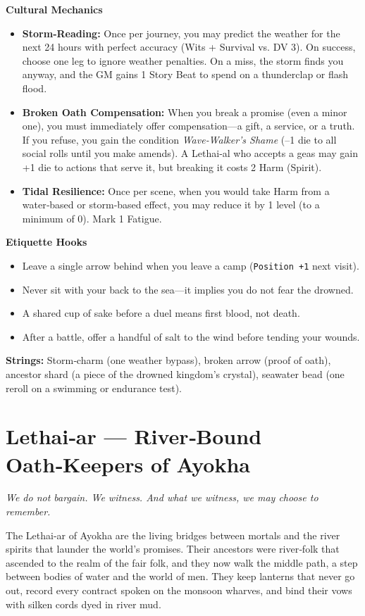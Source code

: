\documentclass[12pt]{book}
\begin{document}
\begin{infobox}
\textbf{Cultural Mechanics}
\begin{itemize}
    \item \textbf{Storm‑Reading:} Once per journey, you may predict the weather for the next 24 hours with perfect accuracy (Wits + Survival vs. DV 3). On success, choose one leg to ignore weather penalties. On a miss, the storm finds you anyway, and the GM gains 1 Story Beat to spend on a thunderclap or flash flood.
    \item \textbf{Broken Oath Compensation:} When you break a promise (even a minor one), you must immediately offer compensation---a gift, a service, or a truth. If you refuse, you gain the condition \textit{Wave‑Walker’s Shame} (--1 die to all social rolls until you make amends). A Lethai‑al who accepts a geas may gain +1 die to actions that serve it, but breaking it costs 2 Harm (Spirit).
    \item \textbf{Tidal Resilience:} Once per scene, when you would take Harm from a water‑based or storm‑based effect, you may reduce it by 1 level (to a minimum of 0). Mark 1 Fatigue.
\end{itemize}
\textbf{Etiquette Hooks}
\begin{itemize}
    \item Leave a single arrow behind when you leave a camp (\texttt{Position +1} next visit).
    \item Never sit with your back to the sea---it implies you do not fear the drowned.
    \item A shared cup of sake before a duel means first blood, not death.
    \item After a battle, offer a handful of salt to the wind before tending your wounds.
\end{itemize}
\textbf{Strings:} Storm‑charm (one weather bypass), broken arrow (proof of oath), ancestor shard (a piece of the drowned kingdom's crystal), seawater bead (one reroll on a swimming or endurance test).
\end{infobox}

\section{Lethai‑ar --- River‑Bound Oath‑Keepers of Ayokha}

\noindent \textit{We do not bargain. We witness. And what we witness, we may choose to remember.}

The Lethai‑ar of Ayokha are the living bridges between mortals and the river spirits that launder the world's promises. Their ancestors were river‑folk that ascended to the realm of the fair folk, and they now walk the middle path, a step between bodies of water and the world of men. They keep lanterns that never go out, record every contract spoken on the monsoon wharves, and bind their vows with silken cords dyed in river mud.
\end{document}
